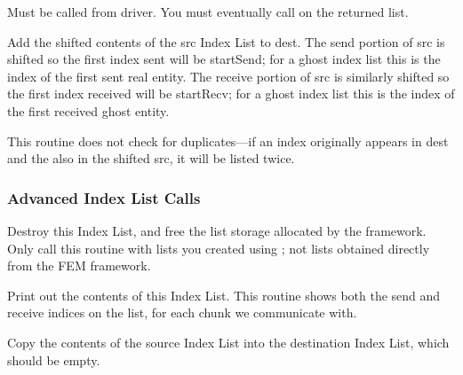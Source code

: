 Must be called from driver.  You must eventually call  on the returned list.



Add the shifted contents of the src Index List to dest.  The send portion of src is shifted so the first index sent will be startSend; for a ghost index list this is the index of the first sent real entity. The receive portion of src is similarly shifted so the first index received will be startRecv; for a ghost index list this is the index of the first received ghost entity.  

This routine does not check for duplicates---if an index originally appears in dest and the also in the shifted src, it will be listed twice.


\subsubsection{Advanced Index List Calls}


Destroy this Index List, and free the list storage allocated by the framework.  Only call this routine with lists you created using ; not lists obtained directly from the FEM framework.


Print out the contents of this Index List.  This routine shows both the send and receive indices on the list, for each chunk we communicate with.



Copy the contents of the source Index List into the destination Index List, which should be empty.



